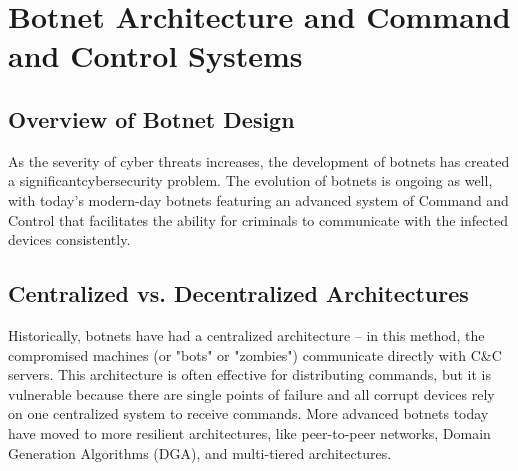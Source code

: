 \documentclass[12pt,letterpaper]{report}
\begin{document}
\section{Botnet Architecture and Command and Control Systems}

\subsection{Overview of Botnet Design}

As the severity of cyber threats increases, the development of botnets has created a significantcybersecurity problem. The evolution of botnets is ongoing as well, with today's modern-day botnets featuring an advanced system of Command and Control that facilitates the ability for criminals to communicate with the infected devices consistently.

\subsection{Centralized vs. Decentralized Architectures}

Historically, botnets have had a centralized architecture – in this method, the compromised machines (or "bots" or "zombies") communicate directly with C\&C servers. This architecture is often effective for distributing commands, but it is vulnerable because there are single points of failure and all corrupt devices rely on one centralized system to receive commands. More advanced botnets today have moved to more resilient architectures, like peer-to-peer networks, Domain Generation Algorithms (DGA), and multi-tiered architectures.
\end{document}

